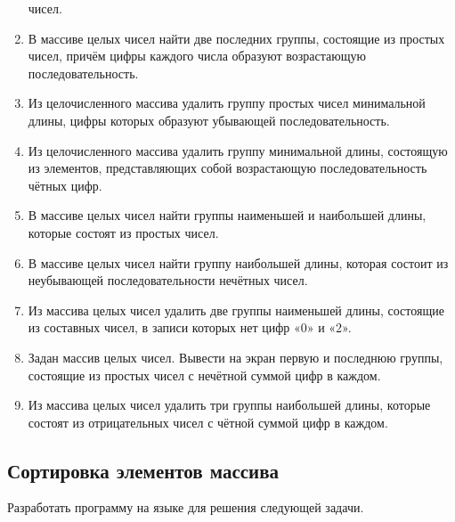 \begin{enumerate}
чисел.
\item В массиве целых чисел найти две последних группы, состоящие из простых чисел, причём цифры каждого числа образуют
возрастающую последовательность.
\item Из целочисленного массива удалить группу простых чисел минимальной длины, цифры которых образуют убывающей
последовательность.
\item Из целочисленного массива удалить группу минимальной длины, состоящую из элементов, представляющих собой
возрастающую последовательность чётных цифр.
\item В массиве целых чисел найти группы наименьшей и наибольшей длины, которые состоят из простых чисел.
\item В массиве целых чисел найти группу наибольшей длины, которая состоит из неубывающей последовательности нечётных
чисел.
\item Из массива целых чисел удалить две группы наименьшей длины, состоящие из составных чисел, в записи которых нет
цифр «0» и «2».
\item Задан массив целых чисел. Вывести на экран первую и последнюю группы, состоящие из простых чисел с нечётной суммой
цифр в каждом.
\item Из массива целых чисел удалить три группы наибольшей длины, которые состоят из отрицательных чисел с чётной суммой
цифр в каждом.
\end{enumerate}

\subsection[Сортировка элементов массива]{Сортировка элементов массива}
Разработать программу на языке  для решения следующей задачи.

